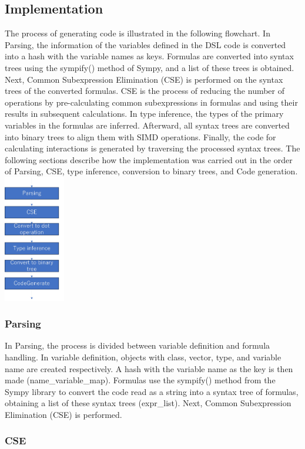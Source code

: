\documentclass[ams, a4j]{U-AizuGT}
\begin{document}
\subsection{Implementation}
The process of generating code is illustrated in the following flowchart. In Parsing, the information
of the variables defined in the DSL code is converted into a hash with the variable names as keys. 
Formulas are converted into syntax trees using the sympify() method of Sympy, and a list of these 
trees is obtained. Next, Common Subexpression Elimination (CSE) is performed on the syntax trees of the converted formulas. CSE is the process 
of reducing the number of operations by pre-calculating common subexpressions in formulas and using 
their results in subsequent calculations. In type inference, the types of the primary variables in the 
formulas are inferred. Afterward, all syntax trees are converted into binary trees to align them with 
SIMD operations. Finally, the code for calculating interactions is generated by traversing the processed 
syntax trees. The following sections describe how the implementation was carried out in the order of
Parsing, CSE, type inference, conversion to binary trees, and Code generation.
\includegraphics[width=0.2\textwidth]{flowchartver3.jpg}
\subsubsection{Parsing}
In Parsing, the process is divided between variable definition and formula handling. In variable definition, 
objects with class, vector, type, and variable name are created respectively. A hash with the variable name
as the key is then made (name\_variable\_map). Formulas use the sympify() method from the Sympy library to convert
the code read as a string into a syntax tree of formulas, obtaining a list of these syntax trees (expr\_list). Next, 
Common Subexpression Elimination (CSE) is performed.
\subsubsection{CSE}
\end{document}
